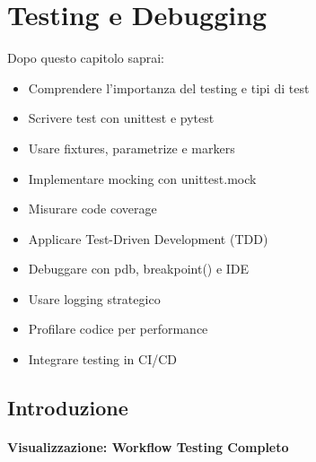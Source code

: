 \chapter{Testing e Debugging}

\begin{tcolorbox}[title=Obiettivi del capitolo]
Dopo questo capitolo saprai:
\begin{itemize}
  \item Comprendere l'importanza del testing e tipi di test
  \item Scrivere test con unittest e pytest
  \item Usare fixtures, parametrize e markers
  \item Implementare mocking con unittest.mock
  \item Misurare code coverage
  \item Applicare Test-Driven Development (TDD)
  \item Debuggare con pdb, breakpoint() e IDE
  \item Usare logging strategico
  \item Profilare codice per performance
  \item Integrare testing in CI/CD
\end{itemize}
\end{tcolorbox}

\section{Introduzione}

\subsubsection{Visualizzazione: Workflow Testing Completo}

